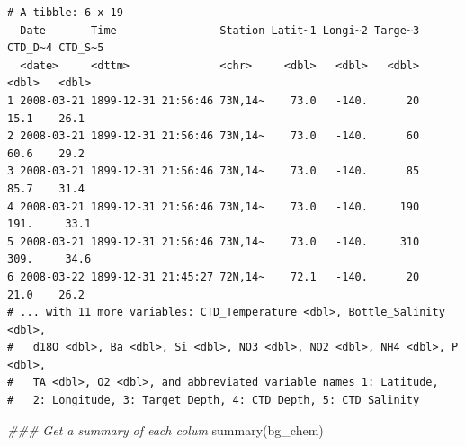 \documentclass[
  letterpaper,
  DIV=11,
  numbers=noendperiod]{scrartcl}
\newenvironment{Shaded}{\begin{snugshade}}{\end{snugshade}}
\newcommand{\DocumentationTok}[1]{\textcolor[rgb]{0.37,0.37,0.37}{\textit{#1}}}
\newcommand{\FunctionTok}[1]{\textcolor[rgb]{0.28,0.35,0.67}{#1}}
\newcommand{\NormalTok}[1]{\textcolor[rgb]{0.00,0.23,0.31}{#1}}
\begin{document}
\begin{verbatim}
# A tibble: 6 x 19
  Date       Time                Station Latit~1 Longi~2 Targe~3 CTD_D~4 CTD_S~5
  <date>     <dttm>              <chr>     <dbl>   <dbl>   <dbl>   <dbl>   <dbl>
1 2008-03-21 1899-12-31 21:56:46 73N,14~    73.0   -140.      20    15.1    26.1
2 2008-03-21 1899-12-31 21:56:46 73N,14~    73.0   -140.      60    60.6    29.2
3 2008-03-21 1899-12-31 21:56:46 73N,14~    73.0   -140.      85    85.7    31.4
4 2008-03-21 1899-12-31 21:56:46 73N,14~    73.0   -140.     190   191.     33.1
5 2008-03-21 1899-12-31 21:56:46 73N,14~    73.0   -140.     310   309.     34.6
6 2008-03-22 1899-12-31 21:45:27 72N,14~    72.1   -140.      20    21.0    26.2
# ... with 11 more variables: CTD_Temperature <dbl>, Bottle_Salinity <dbl>,
#   d18O <dbl>, Ba <dbl>, Si <dbl>, NO3 <dbl>, NO2 <dbl>, NH4 <dbl>, P <dbl>,
#   TA <dbl>, O2 <dbl>, and abbreviated variable names 1: Latitude,
#   2: Longitude, 3: Target_Depth, 4: CTD_Depth, 5: CTD_Salinity
\end{verbatim}

\begin{Shaded}
\begin{Highlighting}[]
\DocumentationTok{\#\#\# Get a summary of each colum}
\FunctionTok{summary}\NormalTok{(bg\_chem)}
\end{Highlighting}
\end{Shaded}
\end{document}
